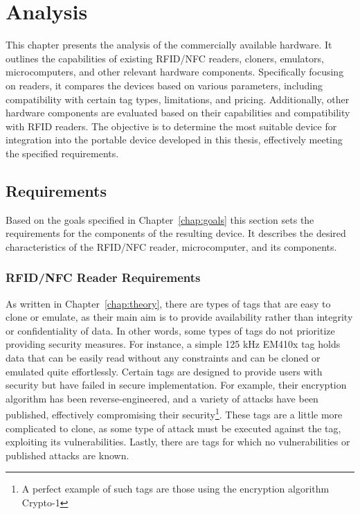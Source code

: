 \chapter{Analysis}
\label{chap:analysis}

This chapter presents the analysis of the commercially available hardware. It outlines the capabilities of existing RFID/NFC readers, cloners, emulators, microcomputers, and other relevant hardware components. Specifically focusing on readers, it compares the devices based on various parameters, including compatibility with certain tag types, limitations, and pricing. Additionally, other hardware components are evaluated based on their capabilities and compatibility with RFID readers. The objective is to determine the most suitable device for integration into the portable device developed in this thesis, effectively meeting the specified requirements.


\section{Requirements}
\label{sec:requirements}

Based on the goals specified in Chapter~\ref{chap:goals} this section sets the requirements for the components of the resulting device. It describes the desired characteristics of the RFID/NFC reader, microcomputer, and its components.

\subsection{RFID/NFC Reader Requirements}

As written in Chapter~\ref{chap:theory}, there are types of tags that are easy to clone or emulate, as their main aim is to provide availability rather than integrity or confidentiality of data. In other words, some types of tags do not prioritize providing security measures. For instance, a simple 125 kHz EM410x tag holds data that can be easily read without any constraints and can be cloned or emulated quite effortlessly. Certain tags are designed to provide users with security but have failed in secure implementation. For example, their encryption algorithm has been reverse-engineered, and a variety of attacks have been published, effectively compromising their security\footnote{A perfect example of such tags are those using the encryption algorithm Crypto-1}. These tags are a little more complicated to clone, as some type of attack must be executed against the tag, exploiting its vulnerabilities. Lastly, there are tags for which no vulnerabilities or published attacks are known.

